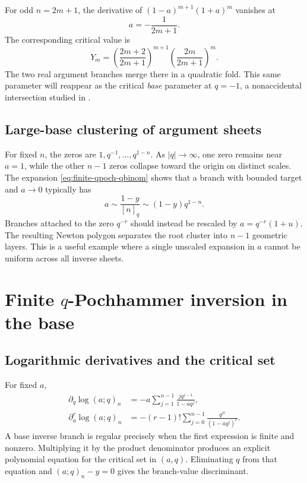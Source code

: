 \documentclass[11pt,letterpaper,oneside,openany]{book}
\theoremstyle{definition}
\theoremstyle{remark}
\begin{document}
For odd \(n=2m+1\), the derivative of
\((1-a)^{m+1}(1+a)^m\) vanishes at
\[
 a=-\frac1{2m+1}.
\]
The corresponding critical value is
\begin{equation}\label{eq:odd-argument-critical-value}
 Y_m=\left(\frac{2m+2}{2m+1}\right)^{m+1}
 \left(\frac{2m}{2m+1}\right)^m.
\end{equation}
The two real argument branches merge there in a quadratic fold.  This same
parameter will reappear as the critical \emph{base} parameter at \(q=-1\), a
nonaccidental intersection studied in .

\section{Large-base clustering of argument sheets}
For fixed \(n\), the zeros are \(1,q^{-1},\ldots,q^{1-n}\).  As
\(|q|\to\infty\), one zero remains near \(a=1\), while the other \(n-1\) zeros
collapse toward the origin on distinct scales.  The expansion
\eqref{eq:finite-qpoch-qbinom} shows that a branch with bounded target and
\(a\to0\) typically has
\[
 a\sim\frac{1-y}{[n]_q}\sim(1-y)q^{1-n}.
\]
Branches attached to the zero \(q^{-r}\) should instead be rescaled by
\(a=q^{-r}(1+u)\).  The resulting Newton polygon separates the root cluster
into \(n-1\) geometric layers.  This is a useful example where a single
unscaled expansion in \(a\) cannot be uniform across all inverse sheets.

\chapter{Finite \texorpdfstring{\(q\)}{q}-Pochhammer inversion in the base}

\section{Logarithmic derivatives and the critical set}
For fixed \(a\),
\begin{align}
 \partial_q\log(a;q)_n
 &=-a\sum_{j=1}^{n-1}\frac{jq^{j-1}}{1-aq^j},
 \label{eq:qpoch-q-logderivative}\\
 \partial_a^r\log(a;q)_n
 &=-(r-1)!\sum_{j=0}^{n-1}\frac{q^{jr}}{(1-aq^j)^r}.
 \label{eq:qpoch-a-higher}
\end{align}
A base inverse branch is regular precisely when the first expression is finite
and nonzero.  Multiplying it by the product denominator produces an explicit
polynomial equation for the critical set in \((a,q)\).  Eliminating \(q\) from
that equation and \((a;q)_n-y=0\) gives the branch-value discriminant.
\end{document}
